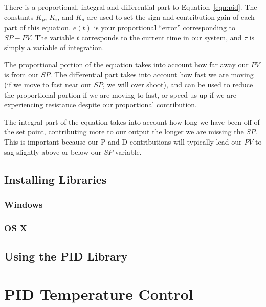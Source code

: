 \documentclass[11pt,a4paper]{article}
\begin{document}
There is a proportional, integral and differential part to Equation~\ref{eqn:pid}.  The constants $K_{p}$, $K_{i}$, and $K_{d}$ are used to set the sign and contribution gain of each part of this equation.  $e(t)$ is your proportional ``error'' corresponding to $SP - PV$.  The variable $t$ corresponds to the current time in our system, and $\tau$ is simply a variable of integration.  

The proportional portion of the equation takes into account how far away our $PV$ is from our $SP$.  The differential part takes into account how fast we are moving (if we move to fast near our $SP$, we will over shoot), and can be used to reduce the proportional portion if we are moving to fast, or speed us up if we are experiencing resistance despite our proportional contribution.  

The integral part of the equation takes into account how long we have been off of the set point, contributing more to our output the longer we are missing the $SP$.  This is important because our P and D contributions will typically lead our $PV$ to sag slightly above or below our $SP$ variable.\cite{pid}

\subsection{Installing Libraries} %
\label{sub:installing_libraries}

\subsubsection{Windows} %
\label{ssub:windows_libraries}


\subsubsection{OS X} %
\label{ssub:os_x_libraries}



\subsection{Using the PID Library} %
\label{sub:using_the_pid_library}


\section{PID Temperature Control} %
\label{sec:pid_temperature_control}
\end{document}
